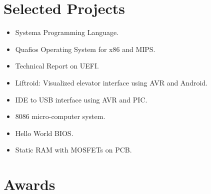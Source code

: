 \documentclass[letterpaper]{twentysecondcv} %
\begin{document}

\section{Selected Projects}

\begin{itemize}
    \item{Systema Programming Language.}
    \item{Quafios Operating System for x86 and MIPS.}
    \item{Technical Report on UEFI.}
    \item{Liftroid: Visualized elevator interface using AVR and Android.}
    \item{IDE to USB interface using AVR and PIC.}
    \item{8086 micro-computer system.}
    \item{Hello World BIOS.}
    \item{Static RAM with MOSFETs on PCB.}
\end{itemize}


\section{Awards}
\end{document}
